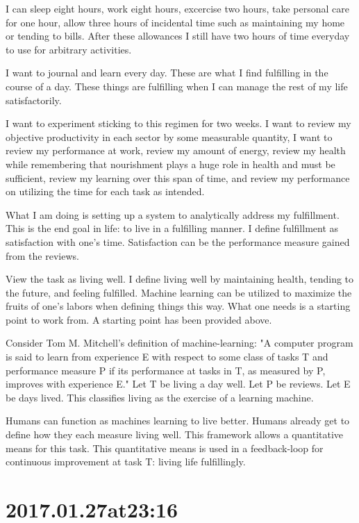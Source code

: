 \begin{enumerate}
\begin{enumerate}
I can sleep eight hours, work eight hours, excercise two hours, take personal care for one hour, allow three hours of incidental time such as maintaining my home or tending to bills.
After these allowances I still have two hours of time everyday to use for arbitrary activities.

I want to journal and learn every day.
These are what I find fulfilling in the course of a day.
These things are fulfilling when I can manage the rest of my life satisfactorily.

I want to experiment sticking to this regimen for two weeks.
I want to review my objective productivity in each sector by some measurable quantity, I want to review my performance at work, review my amount of energy, review my health while remembering that nourishment plays a huge role in health and must be sufficient, review my learning over this span of time, and review my performance on utilizing the time for each task as intended.

What I am doing is setting up a system to analytically address my fulfillment.
This is the end goal in life: to live in a fulfilling manner.
I define fulfillment as satisfaction with one's time.
Satisfaction can be the performance measure gained from the reviews.

View the task as living well.
I define living well by maintaining health, tending to the future, and feeling fulfilled.
Machine learning can be utilized to maximize the fruits of one's labors when defining things this way.
What one needs is a starting point to work from.
A starting point has been provided above. 

Consider Tom M. Mitchell's definition of machine-learning: "A computer program is said to learn from experience E with respect to some class of tasks T and performance measure P if its performance at tasks in T, as measured by P, improves with experience E."
Let T be living a day well.
Let P be reviews.
Let E be days lived.
This classifies living as the exercise of a learning machine.

Humans can function as machines learning to live better.
Humans already get to define how they each measure living well.
This framework allows a quantitative means for this task.
This quantitative means is used in a feedback-loop for continuous improvement at task T: living life fulfillingly.

\section*{ 2017.01.27at23:16 }

\end{enumerate}
\end{enumerate}
